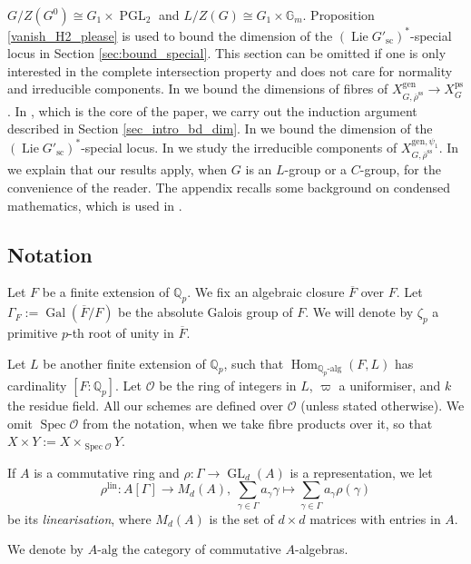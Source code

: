 \documentclass{amsart}
\theoremstyle{definition}
\theoremstyle{remark}
\DeclareMathOperator{\Hom}{Hom}
\DeclareMathOperator{\GL}{GL}
\DeclareMathOperator{\Gal}{Gal}
\DeclareMathOperator{\Spec}{Spec}
\newcommand{\Qp}{\mathbb {Q}_p}
\newcommand{\OO}{\mathcal O}
\newcommand{\pp}{\mathfrak p}
\newcommand{\alg}{\mathrm{alg}}
\newcommand{\rhobar}{\overline{\rho}}
\newcommand{\Gm}{\mathbb G_{m}}
\newcommand{\ps}{\mathrm{ps}}
\newcommand{\gen}{\mathrm{gen}}
\DeclareMathOperator{\PGL}{PGL}
\DeclareMathOperator{\Lie}{Lie}
\newcommand{\lin}{\mathrm{lin}}
\newcommand{\rhobarss}{\rhobar^{\mathrm{ss}}}
\newcommand{\hyphen}{\text{-}}
\newcommand{\sic}{\operatorname{sc}}
\begin{document}
$G/Z(G^0)\cong G_1\times \PGL_2$ and $L/Z(G)\cong G_1\times \Gm$. Proposition \ref{vanish_H2_please} 
is used to bound the dimension of the $(\Lie G'_{\sic})^{\ast}$-special locus in Section \ref{sec:bound_special}.
This section can be omitted if one is only interested in the complete intersection property and does not care for normality and irreducible components. In  we bound the dimensions of fibres of $X^{\gen}_{G, \rhobarss}\rightarrow X^{\ps}_G$.
In , which is the core of the paper,  we carry out the induction argument described in Section \ref{sec_intro_bd_dim}.  
In   we bound the dimension of the $(\Lie G'_{\sic})^*$-special locus. 
In  we study the irreducible components of $X^{\gen,\psi_1}_{G, \rhobarss}$.
In  we explain that our results apply, when $G$ is an $L$-group or a $C$-group, for the convenience of the reader. 
The appendix  recalls some background on condensed mathematics, which is used in .

\subsection{Notation} Let $F$ be a finite extension of $\Qp$. 
We fix an algebraic closure $\overline{F}$ over $F$. Let $\Gamma_F:=\Gal(\overline{F}/F)$
be the absolute Galois group of $F$. 
We will 
denote by $\zeta_p$ a primitive 
$p$-th root of unity in $\overline{F}$. 

Let $L$ be another finite extension of $\mathbb Q_p$, 
such that $\Hom_{\Qp\hyphen\mathrm{alg}}(F, L)$ has cardinality $[F:\Qp]$. 
Let $\OO$ be the ring of integers in $L$, $\varpi$ a uniformiser, and $k$ the residue field. All our schemes are defined over $\OO$ (unless stated otherwise). 
We omit $\Spec \OO$ from the notation, when we take fibre products over it, so 
that $X\times Y:= X\times_{\Spec \OO} Y$.

If $A$ is a commutative ring and $\rho: \Gamma \rightarrow \GL_d(A)$ is a representation, we let 
$$\rho^{\lin}: A[\Gamma]\rightarrow M_d(A), ~\sum_{\gamma\in \Gamma} a_{\gamma} \gamma \mapsto \sum_{\gamma\in \Gamma} a_{\gamma} \rho(\gamma)$$ 
be its \emph{linearisation}, where $M_d(A)$ is the set of $d \times d$ matrices with entries in $A$. 

We denote by $A\hyphen\alg$ the category of commutative $A$-algebras. 
\end{document}

